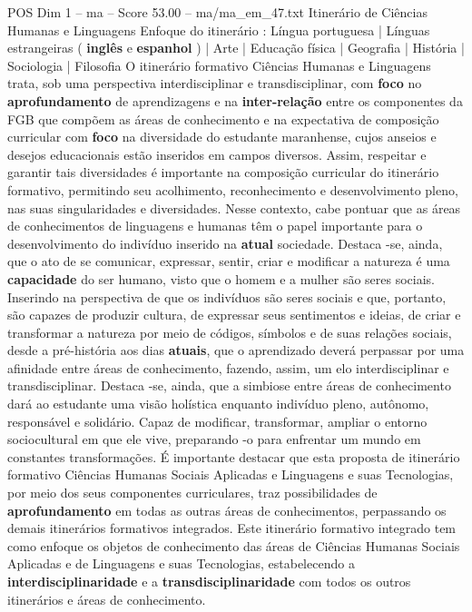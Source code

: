 \begin{textsample}{POS Dim 1 – ma – Score 53.00 – ma/ma\_em\_47.txt}  \label{ex:f1_pos_066}
Itinerário de Ciências Humanas e Linguagens Enfoque do itinerário : Língua portuguesa | Línguas estrangeiras ( \textbf{inglês} e \textbf{espanhol} ) | Arte | Educação física | Geografia | História | Sociologia | Filosofia O itinerário formativo Ciências Humanas e Linguagens trata, sob uma perspectiva interdisciplinar e transdisciplinar, com \textbf{foco} no \textbf{aprofundamento} de aprendizagens e na \textbf{inter-relação} entre os componentes da FGB que compõem as áreas de conhecimento e na expectativa de composição curricular com \textbf{foco} na diversidade do estudante maranhense, cujos anseios e desejos educacionais estão inseridos em campos diversos.
Assim, respeitar e garantir tais diversidades é importante na composição curricular do itinerário formativo, permitindo seu acolhimento, reconhecimento e desenvolvimento pleno, nas suas singularidades e diversidades.
Nesse contexto, cabe pontuar que as áreas de conhecimentos de linguagens e humanas têm o papel importante para o desenvolvimento do indivíduo inserido na \textbf{atual} sociedade.
Destaca -se, ainda, que o ato de se comunicar, expressar, sentir, criar e modificar a natureza é uma \textbf{capacidade} do ser humano, visto que o homem e a mulher são seres sociais.
Inserindo na perspectiva de que os indivíduos são seres sociais e que, portanto, são capazes de produzir cultura, de expressar seus sentimentos e ideias, de criar e transformar a natureza por meio de códigos, símbolos e de suas relações sociais, desde a pré-história aos dias \textbf{atuais}, que o aprendizado deverá perpassar por uma afinidade entre áreas de conhecimento, fazendo, assim, um elo interdisciplinar e transdisciplinar.
Destaca -se, ainda, que a simbiose entre áreas de conhecimento dará ao estudante uma visão holística enquanto indivíduo pleno, autônomo, responsável e solidário.
Capaz de modificar, transformar, ampliar o entorno sociocultural em que ele vive, preparando -o para enfrentar um mundo em constantes transformações.
É importante destacar que esta proposta de itinerário formativo Ciências Humanas Sociais Aplicadas e Linguagens e suas Tecnologias, por meio dos seus componentes curriculares, traz possibilidades de \textbf{aprofundamento} em todas as outras áreas de conhecimentos, perpassando os demais itinerários formativos integrados.
Este itinerário formativo integrado tem como enfoque os objetos de conhecimento das áreas de Ciências Humanas Sociais Aplicadas e de Linguagens e suas Tecnologias, estabelecendo a \textbf{interdisciplinaridade} e a \textbf{transdisciplinaridade} com todos os outros itinerários e áreas de conhecimento.

\end{textsample}
